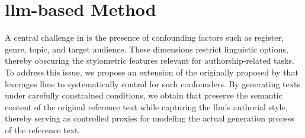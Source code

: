 \chapter{\acs{llm}-based \imp{} Method}
\label{chap:llm_impostor_method}

A central challenge in \ai{} is the presence of confounding factors such as register, genre, topic, and target audience. 
These dimensions restrict linguistic options, thereby obscuring the stylometric features relevant for authorship-related tasks. 
To address this issue, we propose an extension of the \impAppr{} originally proposed by \citet{koppel_determining_2014} that leverages \acp{llm} to systematically control for such confounders. 
By generating texts under carefully constrained conditions, we obtain \imps{} that preserve the semantic content of the original reference text while capturing the \ac{llm}'s authorial style, thereby serving as controlled proxies for modeling the actual generation process of the reference text.






